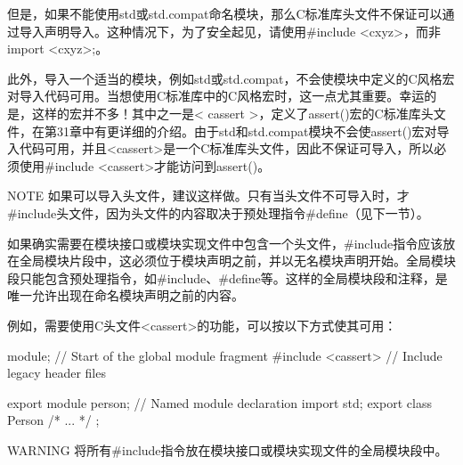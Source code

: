 但是，如果不能使用std或std.compat命名模块，那么C标准库头文件不保证可以通过导入声明导入。这种情况下，为了安全起见，请使用\#include <cxyz>，而非import <cxyz>;。

此外，导入一个适当的模块，例如std或std.compat，不会使模块中定义的C风格宏对导入代码可用。当想使用C标准库中的C风格宏时，这一点尤其重要。幸运的是，这样的宏并不多！其中之一是< cassert >，定义了assert()宏的C标准库头文件，在第31章中有更详细的介绍。由于std和std.compat模块不会使assert()宏对导入代码可用，并且<cassert>是一个C标准库头文件，因此不保证可导入，所以必须使用\#include <cassert>才能访问到assert()。

\begin{myNotic}{NOTE}
如果可以导入头文件，建议这样做。只有当头文件不可导入时，才\#include头文件，因为头文件的内容取决于预处理指令\#define（见下一节）。
\end{myNotic}

如果确实需要在模块接口或模块实现文件中包含一个头文件，\#include指令应该放在全局模块片段中，这必须位于模块声明之前，并以无名模块声明开始。全局模块段只能包含预处理指令，如\#include、\#define等。这样的全局模块段和注释，是唯一允许出现在命名模块声明之前的内容。

例如，需要使用C头文件<cassert>的功能，可以按以下方式使其可用：

\begin{cpp}
module; // Start of the global module fragment
#include <cassert> // Include legacy header files

export module person; // Named module declaration
import std;
export class Person { /* ... */ };
\end{cpp}

\begin{myWarning}{WARNING}
将所有\#include指令放在模块接口或模块实现文件的全局模块段中。
\end{myWarning}











